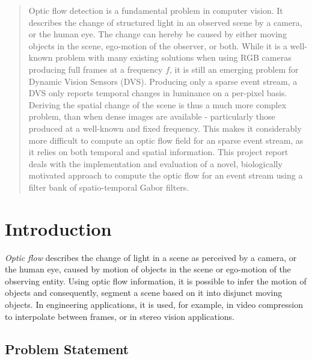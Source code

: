 \documentclass[a4paper,twoside, openright,12pt]{report}
\begin{document}
\phantom{u}
\begin{abstract}
  Optic flow detection is a fundamental problem in computer vision.
  It describes the change of structured light in an observed scene by a camera, or the human eye.
  The change can hereby be caused by either moving objects in the scene, ego-motion of the observer, or both.
  While it is a well-known problem with many existing solutions when using RGB cameras producing full frames at a frequency $f$, it is still an emerging problem for Dynamic Vision Sensors (DVS).
  Producing only a sparse event stream, a DVS only reports temporal changes in luminance on a per-pixel basis.
  Deriving the spatial change of the scene is thus a much more complex problem, than when dense images are available - particularly those produced at a well-known and fixed frequency.
  This makes it considerably more difficult to compute an optic flow field for an sparse event stream, as it relies on both temporal and spatial information.
  This project report deals with the implementation and evaluation of a novel, biologically motivated approach to compute the optic flow for an event stream using a filter bank of spatio-temporal Gabor filters.
\end{abstract}


\pagestyle{fancy}

\tableofcontents

\chapter{Introduction}

\textit{Optic flow} describes the change of light in a scene as perceived by a camera, or the human eye, caused by motion of objects in the scene or ego-motion of the observing entity.
Using optic flow information, it is possible to infer the motion of objects and consequently, segment a scene based on it into disjunct moving objects.
In engineering applications, it is used, for example, in video compression to interpolate between frames, or in stereo vision applications.

\section{Problem Statement}
\end{document}
